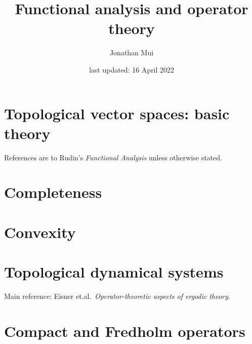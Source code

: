 \documentclass[11pt]{article}
\title{Functional analysis and operator theory}
\author{Jonathan Mui}
\date{last updated: 16 April 2022}
\numberwithin{equation}{section}
\theoremstyle{plain}
\theoremstyle{definition}
\begin{document}
	
	\maketitle
	
	\tableofcontents
	
	\section{Topological vector spaces: basic theory}
	References are to Rudin's \emph{Functional Analysis} unless otherwise stated.
	
	
	\section{Completeness}
	
	
	\section{Convexity}
	
	
	\section{Topological dynamical systems}
	Main reference: Eisner et.al.\, \emph{Operator-theoretic aspects of ergodic theory}.
	
	
	\section{Compact and Fredholm operators}
	
	
\end{document}
